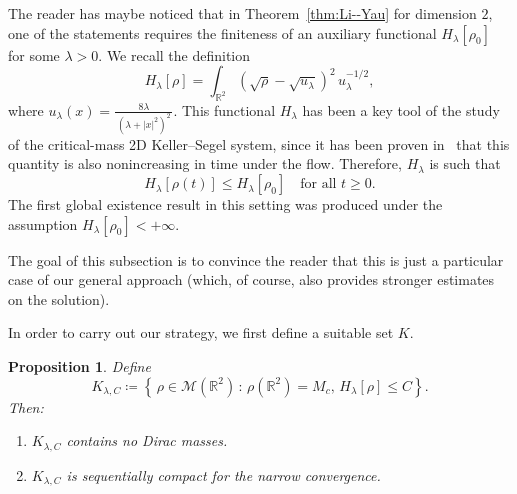 \documentclass[11pt,a4paper]{article}
\numberwithin{equation}{section}
\newcommand{\R}{{\mathbb{R}}}
\theoremstyle{plain}
\newtheorem{proposition}[theorem]{Proposition}
\theoremstyle{remark}
\newcommand {\f}{\frac}
\begin{document}
The reader has maybe noticed that in Theorem~\ref{thm:Li--Yau} for dimension $2$, one of the statements requires the finiteness of an auxiliary functional $H_{\lambda}[\rho_0]$ for some $\lambda>0$. We recall the definition
\[
H_{\lambda}[\rho]
   =   
\int_{\mathbb{R}^2}\left(\sqrt{\rho} - \sqrt{u_\lambda}\right)^2\,u_{\lambda}^{-1/2},
\]
where $u_{\lambda}(x) = \f{8\lambda}{\,(\lambda + |x|^2)^2\,}$. This functional $H_{\lambda}$ has been a key tool of the study of the critical-mass 2D Keller--Segel system, since it has been proven in~\cite{Blanchet_Carlen_Carrillo12} that this quantity is also nonincreasing in time under the flow. Therefore, $H_\lambda$ is such that
\[
    H_{\lambda}[\rho(t)]   \le   H_{\lambda}[\rho_0] \quad \text{for all }t\ge0.
\]
The first global existence result in this setting was produced under the assumption $H_{\lambda}[\rho_0]<+\infty$.

The goal of this subsection is to convince the reader that this is just a particular case of our general approach (which, of course, also provides stronger estimates on the solution).

In order to carry out our strategy, we first define a suitable set $K$. 

\begin{proposition}\label{prop:compact_set_Hlambda}
Define 
\[
    K_{\lambda,C}  \coloneqq  \left\{\, \rho\in \mathcal{M}(\R^2)  \,:\, \rho(\R^2)= M_c, \, H_{\lambda}[\rho]\le C \right\}.
\]
Then:
\begin{enumerate}
    \item $K_{\lambda , C}$ contains no  Dirac masses.
    \item $K_{\lambda , C}$ is sequentially compact for the narrow convergence.
\end{enumerate}
\end{proposition}
\end{document}
